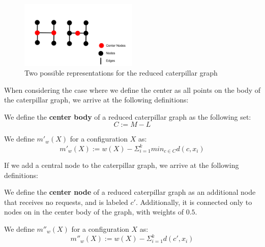 \begin{figure}[H]
    \centering
    \includegraphics[width=0.5\textwidth]{images/center.png}
    \caption{Two possible representations for the reduced caterpillar graph}
    \label{fig:smallcat}
\end{figure}

When considering the case where we define the center as all points on the body of the caterpillar graph, we arrive at the following definitions:

\begin{definition}
     We define the \textbf{center body} of a reduced caterpillar graph as the following set:
        \begin{equation*}
            C := M - L
        \end{equation*}
\end{definition}

\begin{definition}
    We define $m'_w(X)$ for a configuration $X$ as:
    \begin{equation*}
        m'_w(X) := w(X) - \Sigma_{i=1} ^ k min_{c \in C} d(c, x_i)
    \end{equation*}
\end{definition}

If we add a central node to the caterpillar graph, we arrive at the following definitions:

\begin{definition}
    We define the \textbf{center node} of a reduced caterpillar graph as an additional node that receives no requests, and is labeled $c'$. Additionally, it is connected only to nodes on in the center body of the graph, with weights of $0.5$.
\end{definition}

\begin{definition}
    We define $m''_w(X)$ for a configuration $X$ as:
    \begin{equation*}
        m''_w(X) := w(X) - \Sigma_{i=1} ^ k d(c', x_i)
    \end{equation*}
\end{definition}

